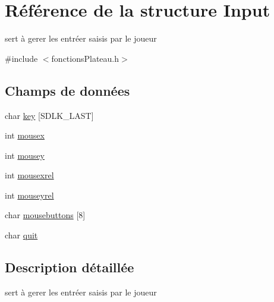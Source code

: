 \hypertarget{struct_input}{\section{\-Référence de la structure \-Input}
\label{struct_input}
}


sert à gerer les entréer saisis par le joueur  




{\ttfamily \#include $<$fonctions\-Plateau.\-h$>$}

\subsection*{\-Champs de données}
\begin{DoxyCompactItemize}
\item 
char \hyperlink{struct_input_afc4eabd057bd0061b56de4005f5ecbb8}{key} \mbox{[}\-S\-D\-L\-K\-\_\-\-L\-A\-S\-T\mbox{]}
\item 
int \hyperlink{struct_input_aa3d2105adcc19a5aba525c805fc49ff2}{mousex}
\item 
int \hyperlink{struct_input_a6d4a0453f23b7c4df1a7be2972529a0b}{mousey}
\item 
int \hyperlink{struct_input_aaa8f2a5a59acca7b0a299a049ae333d7}{mousexrel}
\item 
int \hyperlink{struct_input_a1599b1fc60e4088b883ec01c043ff605}{mouseyrel}
\item 
char \hyperlink{struct_input_adac23ff96bb7e429d24f8ff5fe61ed37}{mousebuttons} \mbox{[}8\mbox{]}
\item 
char \hyperlink{struct_input_a409d6906c2b3bc7112f51e004363ef4e}{quit}
\end{DoxyCompactItemize}


\subsection{\-Description détaillée}
sert à gerer les entréer saisis par le joueur 

